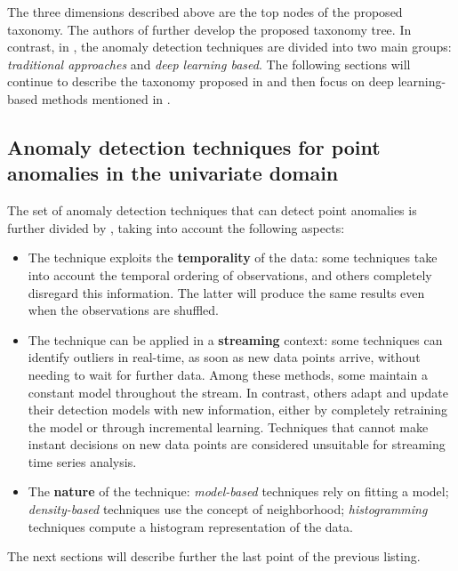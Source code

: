 The three dimensions described above are the top nodes of the proposed taxonomy. The authors of \cite{blazquez2020review} further develop the proposed taxonomy tree. In contrast, in \cite{choi2021deep}, the anomaly detection techniques are divided into two main groups: \textit{traditional approaches} and \textit{deep learning based}. The following sections will continue to describe the taxonomy proposed in \cite{blazquez2020review} and then focus on deep learning-based methods mentioned in \cite{choi2021deep}.

\subsection{Anomaly detection techniques for point anomalies in the univariate domain}
\label{ss:point-anomalies-univariate}
The set of anomaly detection techniques that can detect point anomalies is further divided by \cite{blazquez2020review}, taking into account the following aspects:
\begin{itemize}
    \item The technique exploits the \textbf{temporality} of the data: some techniques take into account the temporal ordering of observations, and others completely disregard this information. The latter will produce the same results even when the observations are shuffled.
    \item The technique can be applied in a \textbf{streaming} context: some techniques can identify outliers in real-time, as soon as new data points arrive, without needing to wait for further data. Among these methods, some maintain a constant model throughout the stream. In contrast, others adapt and update their detection models with new information, either by completely retraining the model or through incremental learning. Techniques that cannot make instant decisions on new data points are considered unsuitable for streaming time series analysis.
    \item The \textbf{nature} of the technique: \textit{model-based} techniques rely on fitting a model; \textit{density-based} techniques use the concept of neighborhood; \textit{histogramming} techniques compute a histogram representation of the data. 
\end{itemize}
The next sections will describe further the last point of the previous listing.

